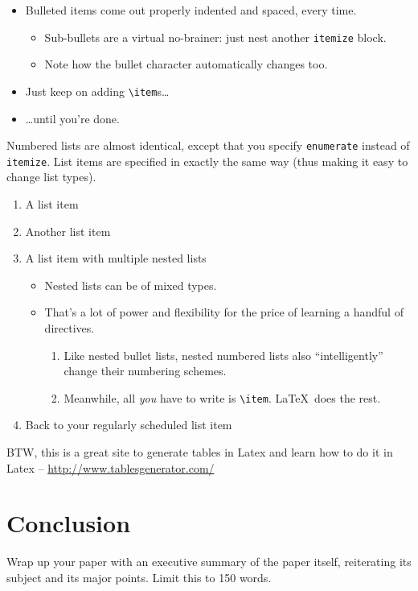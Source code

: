 \documentclass{article}
\begin{document}
\begin{itemize}
\item Bulleted items come out properly indented and spaced, every time.

\begin{itemize}
\item Sub-bullets are a virtual no-brainer: just nest another \verb!itemize! block.
\item Note how the bullet character automatically changes too.
\end{itemize}

\item Just keep on adding \verb!\item!s\ldots

\item \ldots until you're done.
\end{itemize}

Numbered lists are almost identical, except that you specify \verb!enumerate! instead of \verb!itemize!.  List items are specified in exactly the same way (thus making it easy to change list types).

\begin{enumerate}
\item A list item
\item Another list item
\item A list item with multiple nested lists

\begin{itemize}
\item Nested lists can be of mixed types.
\item That's a lot of power and flexibility for the price of learning a handful of directives.

\begin{enumerate}
\item Like nested bullet lists, nested numbered lists also ``intelligently'' change their numbering schemes.
\item Meanwhile, all \emph{you} have to write is \verb!\item!.  \LaTeX\ does the rest.
\end{enumerate}
\end{itemize}

\item Back to your regularly scheduled list item

\end{enumerate}

BTW, this is a great site to generate tables in Latex and learn how to do it in Latex -- \url{http://www.tablesgenerator.com/}


\section{Conclusion}

Wrap up your paper with an executive summary of the paper itself, reiterating its subject and its major points. Limit this to 150 words.
\end{document}
